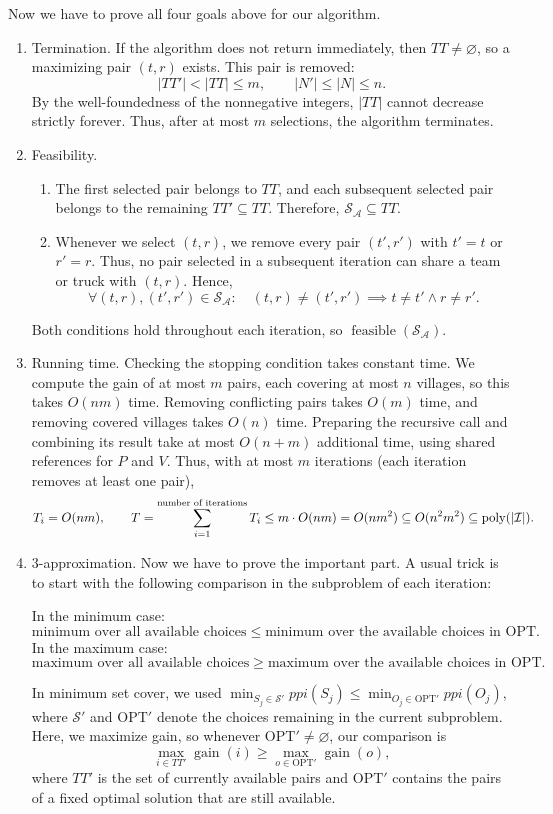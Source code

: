 \documentclass[12pt,a4paper]{article}
\begin{document}
Now we have to prove all four goals above for our algorithm.
\begin{enumerate}
\item Termination. If the algorithm does not return immediately, then
$TT\neq\varnothing$, so a maximizing pair $(t,r)$ exists. This pair is removed:
\[
|TT'|<|TT|\leq m,\qquad |N'|\leq|N|\leq n.
\]
By the well-foundedness of the nonnegative integers, $|TT|$ cannot decrease
strictly forever. Thus, after at most $m$ selections, the algorithm terminates.
\item Feasibility.
\begin{enumerate}
\item The first selected pair belongs to $TT$, and each subsequent selected pair
belongs to the remaining $TT'\subseteq TT$.
Therefore, $\mathcal{S}_{\mathcal{A}}\subseteq TT$.
\item Whenever we select $(t,r)$, we remove every pair $(t',r')$ with
$t'=t$ or $r'=r$. Thus, no pair selected in a subsequent iteration can share
a team or truck with $(t,r)$. Hence,
\[
\forall (t,r),(t',r')\in\mathcal{S}_{\mathcal{A}}:\quad
(t,r)\neq(t',r')\implies t\neq t'\land r\neq r'.
\]
\end{enumerate}
Both conditions hold throughout each iteration, so
$\operatorname{feasible}(\mathcal{S}_{\mathcal{A}})$.
\item Running time. Checking the stopping condition takes constant time. We compute the
gain of at most $m$ pairs, each covering at most $n$ villages, so this takes
$O(nm)$ time. Removing conflicting pairs takes $O(m)$ time, and removing covered villages takes $O(n)$ time.
Preparing the recursive call and combining its result take at most $O(n+m)$
additional time, using shared references for $P$ and $V$. Thus, with at most
$m$ iterations (each iteration removes at least one pair),
\[
T_i=O(nm),\qquad
T=\sum_{i=1}^{\text{number of iterations}}T_i
\leq m\cdot O(nm)
=O(nm^2)\subseteq O(n^2m^2)
\subseteq\operatorname{poly}(|\mathcal{I}|).
\]
\item $3$-approximation. Now we have to prove the important part. A usual trick
is to start with the following comparison in the subproblem of each iteration:

In the minimum case:
\[
\text{minimum over all available choices}
\leq
\text{minimum over the available choices in OPT}.
\]
In the maximum case:
\[
\text{maximum over all available choices}
\geq
\text{maximum over the available choices in OPT}.
\]

In minimum set cover, we used
$\min_{S_j\in\mathcal{S}'}ppi(S_j)\leq\min_{O_j\in\mathrm{OPT}'}ppi(O_j)$,
where $\mathcal{S}'$ and $\mathrm{OPT}'$ denote the choices remaining in the
current subproblem.
Here, we maximize gain, so whenever $\mathrm{OPT}'\neq\varnothing$, our comparison is
\begin{equation}
\label{eq:greedy-gain-comparison}
\max_{i\in TT'}\operatorname{gain}(i)\geq
\max_{o\in\mathrm{OPT}'}\operatorname{gain}(o),
\end{equation}
where $TT'$ is the set of currently available pairs and $\mathrm{OPT}'$
contains the pairs of a fixed optimal solution that are still available.


\end{enumerate}
\end{document}
